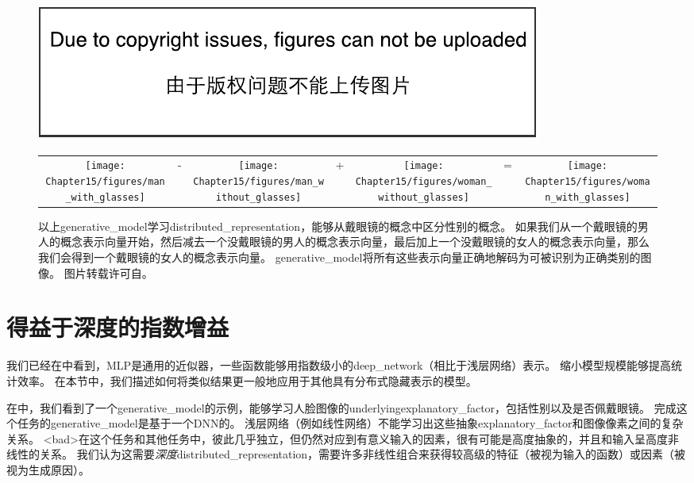 \begin{figure}[!htb]
\ifOpenSource
\centerline{\includegraphics{figure.pdf}}
\else
\begin{tabular}{ccccccc}
\texttt{[image: Chapter15/figures/man\_with\_glasses]} &
- &
\texttt{[image: Chapter15/figures/man\_without\_glasses]} &
+ &
\texttt{[image: Chapter15/figures/woman\_without\_glasses]} &
= &
\texttt{[image: Chapter15/figures/woman\_with\_glasses]}
\end{tabular}
\fi
\caption{以上\gls{generative_model}学习\gls{distributed_representation}，能够从戴眼镜的概念中区分性别的概念。
如果我们从一个戴眼镜的男人的概念表示向量开始，然后减去一个没戴眼镜的男人的概念表示向量，最后加上一个没戴眼镜的女人的概念表示向量，那么我们会得到一个戴眼镜的女人的概念表示向量。
\gls{generative_model}将所有这些表示向量正确地解码为可被识别为正确类别的图像。
图片转载许可自\cite{radford2015unsupervised}。
}
\label{fig:chap15_generative_glasses}
\end{figure}


\section{得益于深度的指数增益}
\label{sec:exponential_gains_from_depth}
我们已经在中看到，\gls{MLP}是通用的近似器，一些函数能够用指数级小的\gls{deep_network}（相比于浅层网络）表示。
缩小模型规模能够提高统计效率。
在本节中，我们描述如何将类似结果更一般地应用于其他具有分布式隐藏表示的模型。

在中，我们看到了一个\gls{generative_model}的示例，能够学习人脸图像的\gls{underlying}\gls{explanatory_factor}，包括性别以及是否佩戴眼镜。
完成这个任务的\gls{generative_model}是基于一个\gls{DNN}的。
浅层网络（例如线性网络）不能学习出这些抽象\gls{explanatory_factor}和图像像素之间的复杂关系。
<bad>在这个任务和其他任务中，彼此几乎独立，但仍然对应到有意义输入的因素，很有可能是高度抽象的，并且和输入呈高度非线性的关系。
我们认为这需要\emph{深度}\gls{distributed_representation}，需要许多非线性组合来获得较高级的特征（被视为输入的函数）或因素（被视为生成原因）。

